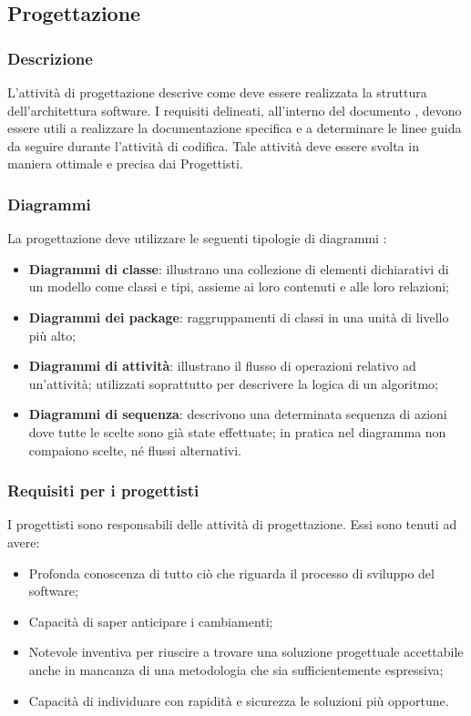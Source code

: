 \documentclass[../NormeDiProgetto.tex]{subfiles}
\begin{document}
      \subsection{Progettazione}
            \subsubsection{Descrizione}
                  L'attività di progettazione descrive come deve essere realizzata la struttura dell'architettura software. I requisiti delineati, all'interno del documento \analisideirequisiti, devono essere utili a realizzare la documentazione specifica e a determinare le linee guida da seguire durante l'attività di codifica. Tale attività deve essere svolta in maniera ottimale e precisa dai Progettisti.

            \subsubsection{Diagrammi}
                  La progettazione deve utilizzare le seguenti tipologie di diagrammi :
                  \begin{itemize}
                        \item \textbf{Diagrammi di classe}: illustrano una collezione di elementi dichiarativi di un modello come classi e tipi, assieme ai loro contenuti e alle loro relazioni;
                        \item \textbf{Diagrammi dei package}: raggruppamenti di classi in una unità di livello più alto;
                        \item \textbf{Diagrammi di attività}: illustrano il flusso di operazioni relativo ad un'attività; utilizzati soprattutto per descrivere la logica di un algoritmo;
                        \item \textbf{Diagrammi di sequenza}: descrivono una determinata sequenza di azioni dove tutte le scelte sono già state effettuate; in pratica nel diagramma non compaiono scelte, né flussi alternativi.
                  \end{itemize}

            \subsubsection{Requisiti per i progettisti}
                  I progettisti sono responsabili delle attività di progettazione. Essi sono tenuti ad avere:
                  \begin{itemize}
                        \item Profonda conoscenza di tutto ciò che riguarda il processo di sviluppo del software;
                        \item Capacità di saper anticipare i cambiamenti;
                        \item Notevole inventiva per riuscire a trovare una soluzione progettuale accettabile anche in mancanza di una metodologia che sia sufficientemente espressiva;
                        \item Capacità di individuare con rapidità e sicurezza le soluzioni più opportune.
                  \end{itemize}
\end{document}
